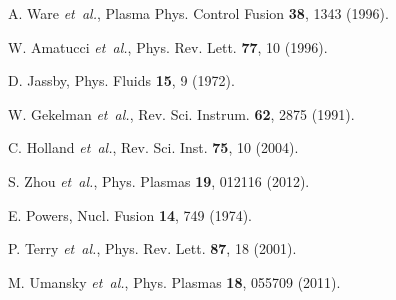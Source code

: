 \documentclass[aps,prl,amsmath,amssymb,reprint,superscriptaddress]{revtex4-1} %
\begin{document}
\begin{thebibliography}{10}
A. Ware {\it et~al.}, Plasma Phys. Control Fusion
  {\bf 38},  1343  (1996).

W. Amatucci {\it et~al.}, Phys. Rev. Lett. {\bf 77},  10  (1996).

D. Jassby, Phys. Fluids {\bf 15},  9  (1972).

W. Gekelman {\it et~al.}, Rev. Sci. Instrum. {\bf 62},  2875  (1991).

C. Holland {\it et~al.}, Rev. Sci. Inst. {\bf 75},  10
  (2004).

S. Zhou {\it et~al.}, Phys. Plasmas {\bf 19},  012116  (2012).

E. Powers, Nucl. Fusion {\bf 14},  749  (1974).

P. Terry {\it et~al.}, Phys. Rev. Lett. {\bf 87},  18  (2001).

M. Umansky {\it et~al.}, Phys. Plasmas {\bf 18},  055709  (2011).

\end{thebibliography}
\end{document}
